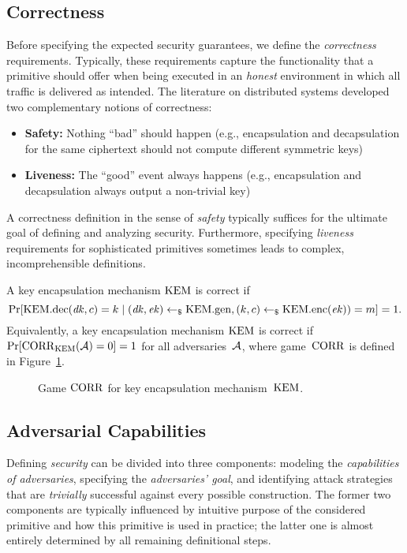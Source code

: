 \documentclass[a4paper,orivec]{llncs}
\begin{document}
\subsection{Correctness}
Before specifying the expected security guarantees, we define the \emph{correctness} requirements.
Typically, these requirements capture the functionality that a primitive should offer when being executed in an \emph{honest} environment in which all traffic is delivered as intended.
The literature on distributed systems developed two complementary notions of correctness:
\begin{itemize}
    \item \textbf{Safety:} Nothing ``bad'' should happen (e.g., encapsulation and decapsulation for the same ciphertext should not compute different symmetric keys)
    \item \textbf{Liveness:} The ``good'' event always happens (e.g., encapsulation and decapsulation always output a non-trivial key)
\end{itemize}

A correctness definition in the sense of \emph{safety} typically suffices for the ultimate goal of defining and analyzing security.
Furthermore, specifying \emph{liveness} requirements for sophisticated primitives sometimes leads to complex, incomprehensible definitions.

A key encapsulation mechanism $\mathrm{KEM}$ is correct if
\[
\Pr[\mathrm{KEM}.\mathrm{dec}(\mathit{dk},c)=k\mid (\mathit{dk},\mathit{ek})\gets_\$\mathrm{KEM}.\mathrm{gen},(k,c)\gets_\$\mathrm{KEM}.\mathrm{enc}(\mathit{ek}))=m]=1\text{.}
\]
Equivalently, a key encapsulation mechanism $\mathrm{KEM}$ is correct if $\Pr[\mathrm{CORR}_{\mathrm{KEM}}(\mathcal{A})=0]=1$ for all adversaries~$\mathcal{A}$, where game~$\mathrm{CORR}$ is defined in Figure~\ref{fig:kem:corr}.

\begin{figure}[!ht]
    \centering
    \nicoresetlinenr%
    \fbox{%
        \scalebox{\codescalefactor}{%
        }%
    }
    \caption{%
        Game $\mathrm{CORR}$ for key encapsulation mechanism~$\mathrm{KEM}$.
    }
    \label{fig:kem:corr}
\end{figure}

\subsection{Adversarial Capabilities}
Defining \emph{security} can be divided into three components:
modeling the \emph{capabilities of adversaries},
specifying the \emph{adversaries' goal}, and
identifying attack strategies that are \emph{trivially} successful against every possible construction.
The former two components are typically influenced by intuitive purpose of the considered primitive and how this primitive is used in practice;
the latter one is almost entirely determined by all remaining definitional steps.
\end{document}
